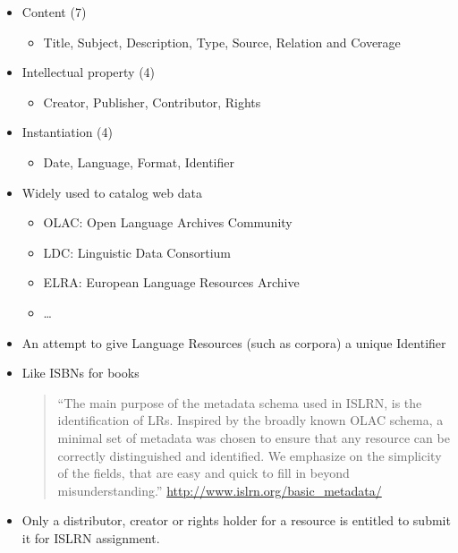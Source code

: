 \documentclass[a4paper,landscape,headrule,footrule,dvips]{foils}
\begin{document}
\begin{CJK}{UTF8}{min}
\MyLogo{}
\begin{itemize}
\item Content (7)
  \begin{itemize}
  \item Title, Subject, Description, Type, Source,
    Relation and Coverage
  \end{itemize}
\item Intellectual property (4)
  \begin{itemize}
  \item Creator, Publisher, Contributor, Rights
  \end{itemize}
\item Instantiation (4)
  \begin{itemize}
  \item Date, Language, Format, Identifier
  \end{itemize}
\end{itemize}
	


\begin{itemize}
\item Widely used to catalog web data
  \begin{itemize}
  \item OLAC: Open Language Archives Community
  \item LDC: Linguistic Data Consortium
  \item ELRA: European Language Resources Archive
  \item \ldots
  \end{itemize}
\end{itemize}

\begin{itemize}
\item An attempt to give Language Resources (such as corpora) a unique Identifier
\item Like ISBNs for books
  \begin{quote}
    ``The main purpose of the metadata schema used in ISLRN, is the
    identification of LRs. Inspired by the broadly known OLAC schema,
    a minimal set of metadata was chosen to ensure that any resource
    can be correctly distinguished and identified. We emphasize on the
    simplicity of the fields, that are easy and quick to fill in
    beyond misunderstanding.''
\hfill    \url{http://www.islrn.org/basic_metadata/}
  \end{quote}
  \item  Only a distributor, creator or rights holder for a resource is entitled to submit it for ISLRN assignment.
\end{itemize}


\end{CJK}
\end{document}
